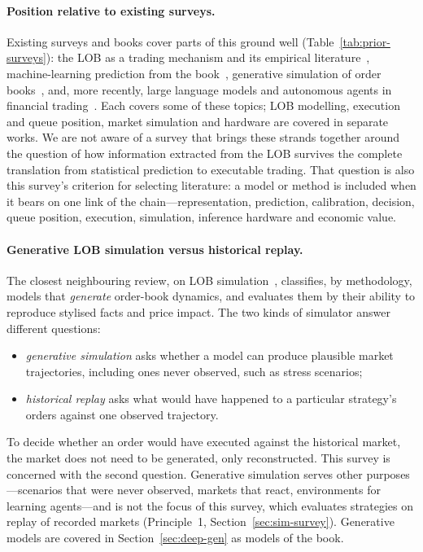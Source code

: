 \paragraph{Position relative to existing surveys.} Existing surveys and books cover parts of this
ground well (Table~\ref{tab:prior-surveys}): the LOB as a trading mechanism and its empirical
literature~\citep{gould2013,tripathi2020}, machine-learning prediction from the
book~\citep{zaznov2022}, generative simulation of order books~\citep{jain2024sim}, and, more recently,
large language models and autonomous agents in financial
trading~\citep{ding2024llmtrading,dong2025llmfinance,hua2026agentic}. Each covers some of these topics; LOB modelling, execution and queue position, market simulation and
hardware are covered in separate works. We are not aware of a
survey that brings these strands together around the question of how information extracted from the
LOB survives the complete translation from statistical prediction to executable trading. That question
is also this survey's criterion for selecting literature: a model or method is included when it bears
on one link of the chain---representation, prediction, calibration, decision, queue position,
execution, simulation, inference hardware and economic value.

\paragraph{Generative LOB simulation versus historical replay.} The closest neighbouring review, on
LOB simulation~\citep{jain2024sim}, classifies, by methodology, models that \emph{generate} order-book dynamics, and evaluates them by their ability
to reproduce stylised facts and price impact. The two kinds of simulator answer different questions:
\begin{itemize}[leftmargin=1.5em,itemsep=1pt]
\item \emph{generative simulation} asks whether a model can produce plausible market trajectories,
  including ones never observed, such as stress scenarios;
\item \emph{historical replay} asks what would have happened to a particular strategy's orders against
  one observed trajectory.
\end{itemize}
To decide whether an order would have executed against the historical market, the market does not
need to be generated, only reconstructed. This survey is concerned with the second question. Generative simulation
serves other purposes---scenarios that were never observed, markets that react, environments for learning agents---and
is not the focus of this survey, which evaluates strategies on replay of recorded markets (Principle~1,
Section~\ref{sec:sim-survey}). Generative models are covered in Section~\ref{sec:deep-gen} as models of the book.

